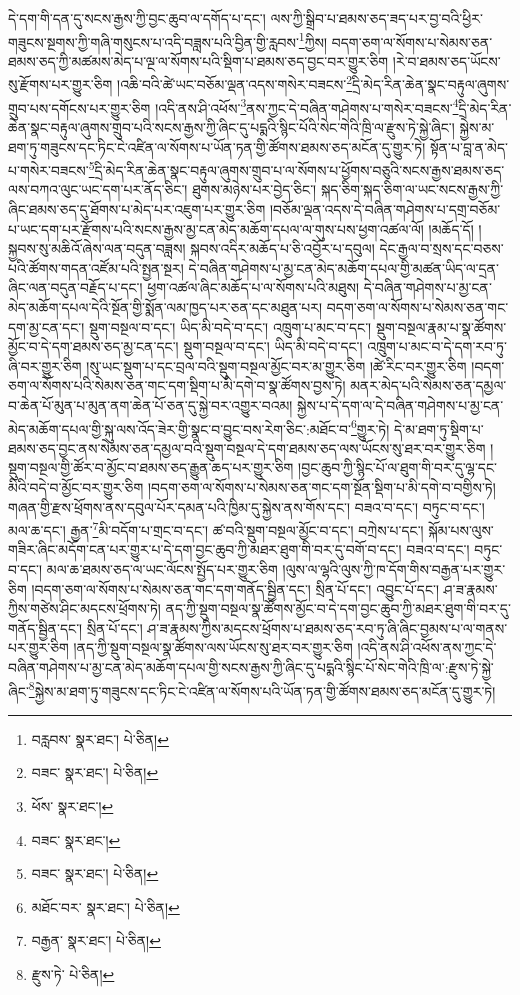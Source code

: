 དེ་དག་གི་དན་དུ་སངས་རྒྱས་ཀྱི་བྱང་ཆུབ་ལ་དགོད་པ་དང་། ལས་ཀྱི་སྒྲིབ་པ་ཐམས་ཅད་ཟད་པར་བྱ་བའི་ཕྱིར་གཟུངས་སྔགས་ཀྱི་གཞི་གསུངས་པ་འདི་བཟླས་པའི་བྱིན་གྱི་རླབས་\footnote{བརླབས་  སྣར་ཐང་།  པེ་ཅིན། }ཀྱིས། བདག་ཅག་ལ་སོགས་པ་སེམས་ཅན་ཐམས་ཅད་ཀྱི་མཚམས་མེད་པ་ལྔ་ལ་སོགས་པའི་སྡིག་པ་ཐམས་ཅད་བྱང་བར་གྱུར་ཅིག །རེ་བ་ཐམས་ཅད་ཡོངས་སུ་རྫོགས་པར་གྱུར་ཅིག །འཆི་བའི་ཚེ་ཡང་བཅོམ་ལྡན་འདས་གསེར་བཟངས་\footnote{བཟང་  སྣར་ཐང་།  པེ་ཅིན། }དྲི་མེད་རིན་ཆེན་སྣང་བརྟུལ་ཞུགས་གྲུབ་པས་དགོངས་པར་གྱུར་ཅིག །འདི་ནས་ཤི་འཕོས་\footnote{ཕོས་  སྣར་ཐང་། }ནས་ཀྱང་དེ་བཞིན་གཤེགས་པ་གསེར་བཟངས་\footnote{བཟང་  སྣར་ཐང་། }དྲི་མེད་རིན་ཆེན་སྣང་བརྟུལ་ཞུགས་གྲུབ་པའི་སངས་རྒྱས་ཀྱི་ཞིང་དུ་པདྨའི་སྙིང་པོའི་སེང་གེའི་ཁྲི་ལ་རྫུས་ཏེ་སྐྱེ་ཞིང་། སྐྱེས་མ་ཐག་ཏུ་གཟུངས་དང་ཏིང་ངེ་འཛིན་ལ་སོགས་པ་ཡོན་ཏན་གྱི་ཚོགས་ཐམས་ཅད་མངོན་དུ་གྱུར་ཏེ། སྟོན་པ་བླ་ན་མེད་པ་གསེར་བཟངས་\footnote{བཟང་  སྣར་ཐང་།  པེ་ཅིན། }དྲི་མེད་རིན་ཆེན་སྣང་བརྟུལ་ཞུགས་གྲུབ་པ་ལ་སོགས་པ་ཕྱོགས་བཅུའི་སངས་རྒྱས་ཐམས་ཅད་ལས་བཀའ་ལུང་ཡང་དག་པར་ནོད་ཅིང་། ཐུགས་མཉེས་པར་བྱེད་ཅིང་། སྐད་ཅིག་སྐད་ཅིག་ལ་ཡང་སངས་རྒྱས་ཀྱི་ཞིང་ཐམས་ཅད་དུ་ཐོགས་པ་མེད་པར་འཇུག་པར་གྱུར་ཅིག །བཅོམ་ལྡན་འདས་དེ་བཞིན་གཤེགས་པ་དགྲ་བཅོམ་པ་ཡང་དག་པར་རྫོགས་པའི་སངས་རྒྱས་མྱ་ངན་མེད་མཆོག་དཔལ་ལ་གུས་པས་ཕྱག་འཚལ་ལོ། །མཆོད་དོ། །སྐྱབས་སུ་མཆིའོ་ཞེས་ལན་བདུན་བཟླས། སྐབས་འདིར་མཆོད་པ་ཅི་འབྱོར་པ་དབུལ། དེང་རྒྱལ་བ་སྲས་དང་བཅས་པའི་ཚོགས་གདན་འཛོམ་པའི་སྤྱན་སྔར། དེ་བཞིན་གཤེགས་པ་མྱ་ངན་མེད་མཆོག་དཔལ་གྱི་མཚན་ཡིད་ལ་དྲན་ཞིང་ལན་བདུན་བརྗོད་པ་དང་། ཕྱག་འཚལ་ཞིང་མཆོད་པ་ལ་སོགས་པའི་མཐུས། དེ་བཞིན་གཤེགས་པ་མྱ་ངན་མེད་མཆོག་དཔལ་དེའི་སྔོན་གྱི་སྨོན་ལམ་ཁྱད་པར་ཅན་དང་མཐུན་པར། བདག་ཅག་ལ་སོགས་པ་སེམས་ཅན་གང་དག་མྱ་ངན་དང་། སྡུག་བསྔལ་བ་དང་། ཡིད་མི་བདེ་བ་དང་། འཁྲུག་པ་མང་བ་དང་། སྡུག་བསྔལ་རྣམ་པ་སྣ་ཚོགས་མྱོང་བ་དེ་དག་ཐམས་ཅད་མྱ་ངན་དང་། སྡུག་བསྔལ་བ་དང་། ཡིད་མི་བདེ་བ་དང་། འཁྲུག་པ་མང་བ་དེ་དག་རབ་ཏུ་ཞི་བར་གྱུར་ཅིག །སུ་ཡང་སྡུག་པ་དང་བྲལ་བའི་སྡུག་བསྔལ་མྱོང་བར་མ་གྱུར་ཅིག །ཚེ་རིང་བར་གྱུར་ཅིག །བདག་ཅག་ལ་སོགས་པའི་སེམས་ཅན་གང་དག་སྡིག་པ་མི་དགེ་བ་སྣ་ཚོགས་བྱས་ཏེ། མནར་མེད་པའི་སེམས་ཅན་དམྱལ་བ་ཆེན་པོ་མུན་པ་མུན་ནག་ཆེན་པོ་ཅན་དུ་སྐྱེ་བར་འགྱུར་བའམ། སྐྱེས་པ་དེ་དག་ལ་དེ་བཞིན་གཤེགས་པ་མྱ་ངན་མེད་མཆོག་དཔལ་གྱི་སྐུ་ལས་འོད་ཟེར་གྱི་སྣང་བ་བྱུང་བས་རེག་ཅིང་:མཐོང་བ་\footnote{མཐོང་བར་  སྣར་ཐང་།  པེ་ཅིན། }གྱུར་ཏེ། དེ་མ་ཐག་ཏུ་སྡིག་པ་ཐམས་ཅད་བྱང་ནས་སེམས་ཅན་དམྱལ་བའི་སྡུག་བསྔལ་དེ་དག་ཐམས་ཅད་ལས་ཡོངས་སུ་ཐར་བར་གྱུར་ཅིག །སྡུག་བསྔལ་གྱི་ཚོར་བ་མྱོང་བ་ཐམས་ཅད་རྒྱུན་ཆད་པར་གྱུར་ཅིག །བྱང་ཆུབ་ཀྱི་སྙིང་པོ་ལ་ཐུག་གི་བར་དུ་ལྷ་དང་མིའི་བདེ་བ་མྱོང་བར་གྱུར་ཅིག །བདག་ཅག་ལ་སོགས་པ་སེམས་ཅན་གང་དག་སྔོན་སྡིག་པ་མི་དགེ་བ་བགྱིས་ཏེ། གཞན་གྱི་རྫས་ཕྲོགས་ནས་དབུལ་པོར་དམན་པའི་ཁྱིམ་དུ་སྐྱེས་ནས་གོས་དང་། བཟའ་བ་དང་། བཏུང་བ་དང་། མལ་ཆ་དང་། རྒྱན་\footnote{བརྒྱན་  སྣར་ཐང་།  པེ་ཅིན། }མི་བདོག་པ་གྲང་བ་དང་། ཚ་བའི་སྡུག་བསྔལ་མྱོང་བ་དང་། བཀྲེས་པ་དང་། སྐོམ་པས་ལུས་གཟིར་ཞིང་མདོག་ངན་པར་གྱུར་པ་དེ་དག་བྱང་ཆུབ་ཀྱི་མཐར་ཐུག་གི་བར་དུ་བགོ་བ་དང་། བཟའ་བ་དང་། བཏུང་བ་དང་། མལ་ཆ་ཐམས་ཅད་ལ་ཡང་ལོངས་སྤྱོད་པར་གྱུར་ཅིག །ལུས་ལ་ལྷའི་ལུས་ཀྱི་ཁ་དོག་གིས་བརྒྱན་པར་གྱུར་ཅིག །བདག་ཅག་ལ་སོགས་པ་སེམས་ཅན་གང་དག་གནོད་སྦྱིན་དང་། སྲིན་པོ་དང་། འབྱུང་པོ་དང་། ཤ་ཟ་རྣམས་ཀྱིས་གཙེས་ཤིང་མདངས་ཕྲོགས་ཏེ། ནད་ཀྱི་སྡུག་བསྔལ་སྣ་ཚོགས་མྱོང་བ་དེ་དག་བྱང་ཆུབ་ཀྱི་མཐར་ཐུག་གི་བར་དུ་གནོད་སྦྱིན་དང་། སྲིན་པོ་དང་། ཤ་ཟ་རྣམས་ཀྱིས་མདངས་ཕྲོགས་པ་ཐམས་ཅད་རབ་ཏུ་ཞི་ཞིང་བྱམས་པ་ལ་གནས་པར་གྱུར་ཅིག །ནད་ཀྱི་སྡུག་བསྔལ་སྣ་ཚོགས་ལས་ཡོངས་སུ་ཐར་བར་གྱུར་ཅིག །འདི་ནས་ཤི་འཕོས་ནས་ཀྱང་དེ་བཞིན་གཤེགས་པ་མྱ་ངན་མེད་མཆོག་དཔལ་གྱི་སངས་རྒྱས་ཀྱི་ཞིང་དུ་པདྨའི་སྙིང་པོ་སེང་གེའི་ཁྲི་ལ་:རྫུས་ཏེ་སྐྱེ་ཞིང་\footnote{རྫུས་ཏེ་  པེ་ཅིན། }སྐྱེས་མ་ཐག་ཏུ་གཟུངས་དང་ཏིང་ངེ་འཛིན་ལ་སོགས་པའི་ཡོན་ཏན་གྱི་ཚོགས་ཐམས་ཅད་མངོན་དུ་གྱུར་ཏེ། 